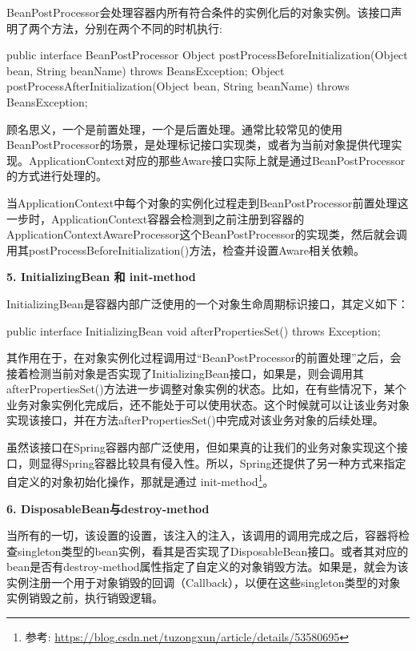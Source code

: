 BeanPostProcessor会处理容器内所有符合条件的实例化后的对象实例。该接口声明了两个方法，分别在两个不同的时机执行:

\begin{Java}
public interface BeanPostProcessor {
    Object postProcessBeforeInitialization(Object bean, String beanName) throws BeansException;  
    Object postProcessAfterInitialization(Object bean, String beanName) throws BeansException;  
}
\end{Java}

顾名思义，一个是前置处理，一个是后置处理。通常比较常见的使用BeanPostProcessor的场景，是处理标记接口实现类，或者为当前对象提供代理实现。ApplicationContext对应的那些Aware接口实际上就是通过BeanPostProcessor的方式进行处理的。

当ApplicationContext中每个对象的实例化过程走到BeanPostProcessor前置处理这一步时，ApplicationContext容器会检测到之前注册到容器的ApplicationContextAwareProcessor这个BeanPostProcessor的实现类，然后就会调用其postProcessBeforeInitialization()方法，检查并设置Aware相关依赖。

\noindent\textbf{5. InitializingBean 和 init-method}

InitializingBean是容器内部广泛使用的一个对象生命周期标识接口，其定义如下：

\begin{Java}
public interface InitializingBean {     
    void afterPropertiesSet() throws Exception; 
} 
\end{Java}

其作用在于，在对象实例化过程调用过“BeanPostProcessor的前置处理”之后，会接着检测当前对象是否实现了InitializingBean接口，如果是，则会调用其afterPropertiesSet()方法进一步调整对象实例的状态。比如，在有些情况下，某个业务对象实例化完成后，还不能处于可以使用状态。这个时候就可以让该业务对象实现该接口，并在方法afterPropertiesSet()中完成对该业务对象的后续处理。

虽然该接口在Spring容器内部广泛使用，但如果真的让我们的业务对象实现这个接口，则显得Spring容器比较具有侵入性。所以，Spring还提供了另一种方式来指定自定义的对象初始化操作，那就是通过 init-method\footnote{参考: \url{https://blog.csdn.net/tuzongxun/article/details/53580695}}。

\noindent\textbf{6. DisposableBean与destroy-method}

当所有的一切，该设置的设置，该注入的注入，该调用的调用完成之后，容器将检查singleton类型的bean实例，看其是否实现了DisposableBean接口。或者其对应的bean是否有destroy-method属性指定了自定义的对象销毁方法。如果是，就会为该实例注册一个用于对象销毁的回调（Callback），以便在这些singleton类型的对象实例销毁之前，执行销毁逻辑。


